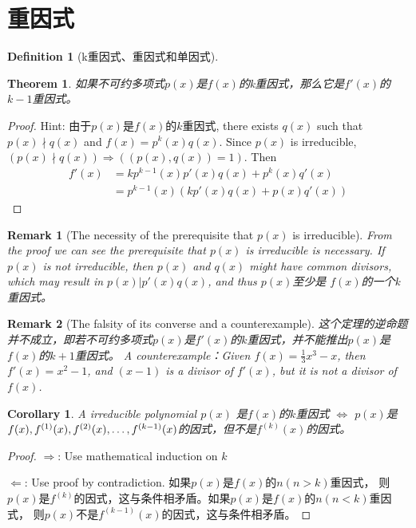 \documentclass[onecolumn]{ctexart}
\newtheorem{definition}{Definition}
\newtheorem{theorem}{Theorem}
\newtheorem{corollary}{Corollary}
\newtheorem{remark}{Remark}
\begin{document}
\section{重因式}

\begin{definition}[k重因式、重因式和单因式]
  
\end{definition}

\begin{theorem}
  如果不可约多项式$p(x)$是$f(x)$的k重因式，那么它是$f'(x)$的$k-1$重因式。
\end{theorem}
\begin{proof}
  Hint: 由于$p(x)$是$f(x)$的$k$重因式, there exists $q(x)$ such that $p(x) \nmid q(x)$ 
  and $f(x) = p^k(x)q(x)$. Since $p(x)$ is irreducible, $(p(x) \nmid q(x)) 
  \Rightarrow ((p(x), q(x)) = 1)$. Then
  \[
    \begin{split}
      f'(x) &= kp^{k-1}(x)p'(x)q(x) + p^k(x)q'(x) \\
            &= p^{k-1}(x)(kp'(x)q(x) + p(x)q'(x))
    \end{split}
  \]
\end{proof}
\begin{remark}[The necessity of the prerequisite that $p(x)$ is irreducible]
  From the proof we can see the prerequisite that $p(x)$ is irreducible is 
  necessary. If $p(x)$ is not irreducible, then $p(x)$ and $q(x)$ might have 
  common divisors, which may result in $p(x) | p'(x)q(x)$, and thus $p(x)$至少是
  $f(x)$的一个k重因式。
\end{remark}
\begin{remark}[The falsity of its converse and a counterexample]
  这个定理的逆命题并不成立，即若不可约多项式$p(x)$是$f'(x)$的$k$重因式，并不能推出$p(x)$是$f(x)$的$k+1$重因式。
  A counterexample：Given $f(x) = \frac{1}{3}x^3 - x$, then $f'(x) = x^2 - 1$, and $(x - 1)$ is a divisor of 
  $f'(x)$, but it is not a divisor of $f(x)$.
\end{remark}

\begin{corollary}
  A irreducible polynomial $p(x)$ 是$f(x)$的$k$重因式 $\Leftrightarrow$ $p(x)$是$f(x), f^{(1)}(x), f^{(2)}(x), \ldots, \\ 
  f^{(k-1)}(x)$的因式，但不是$f^{(k)}(x)$的因式。
\end{corollary}
\begin{proof}
  $\Rightarrow$: Use mathematical induction on $k$

  $\Leftarrow$: Use proof by contradiction. 如果$p(x)$是$f(x)$的$n (n > k)$重因式，
  则$p(x)$是$f^{(k)}$的因式，这与条件相矛盾。如果$p(x)$是$f(x)$的$n (n < k)$重因式，
  则$p(x)$不是$f^{(k-1)}(x)$的因式，这与条件相矛盾。
\end{proof}
\end{document}
